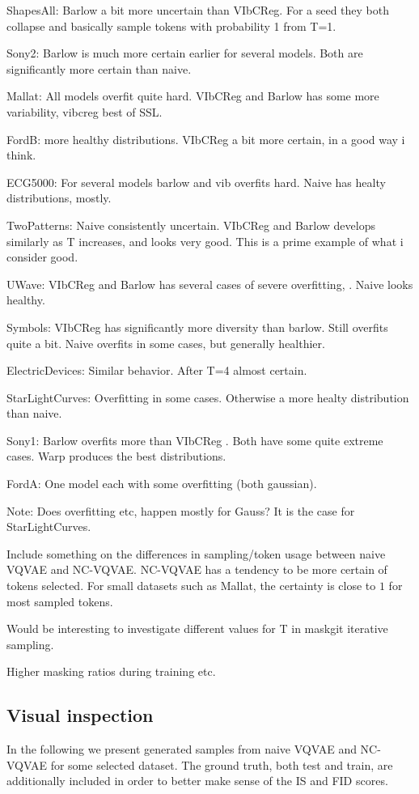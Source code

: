 \documentclass[../../thesis.tex]{subfiles}
\begin{document}
ShapesAll: Barlow a bit more uncertain than VIbCReg. For a seed they both collapse and basically sample tokens with probability 1 from T=1.

Sony2: Barlow is much more certain earlier for several models. Both are significantly more certain than naive.

Mallat: All models overfit quite hard. VIbCReg and Barlow has some more variability, vibcreg best of SSL.

FordB: more healthy distributions. VIbCReg a bit more certain, in a good way i think.

ECG5000: For several models barlow and vib overfits hard. Naive has healty distributions, mostly. 

TwoPatterns: Naive consistently uncertain. VIbCReg and Barlow develops similarly as T increases, and looks very good. This is a prime example of what i consider good.

UWave: VIbCReg and Barlow has several cases of severe overfitting, . Naive looks healthy.

Symbols: VIbCReg has significantly more diversity than barlow. Still overfits quite a bit. Naive overfits in some cases, but generally healthier.

ElectricDevices: Similar behavior. After T=4 almost certain.

StarLightCurves: Overfitting in some cases. Otherwise a more healty distribution than naive.

Sony1: Barlow overfits more than VIbCReg . Both have some quite extreme cases. Warp produces the best distributions. 

FordA: One model each with some overfitting (both gaussian). 

Note: Does overfitting etc, happen mostly for Gauss? It is the case for StarLightCurves.

Include something on the differences in sampling/token usage between naive VQVAE and NC-VQVAE. NC-VQVAE has a tendency to be more certain of tokens selected. For small datasets such as Mallat, the certainty is close to $1$ for most sampled tokens. 


Would be interesting to investigate different values for T in maskgit iterative sampling.


Higher masking ratios during training etc.

\subsection{Visual inspection}
\label{section:Visual inspection}
In the following we present generated samples from naive VQVAE and NC-VQVAE for some selected dataset. The ground truth, both test and train, are additionally included in order to better make sense of the IS and FID scores. \newline
\end{document}

